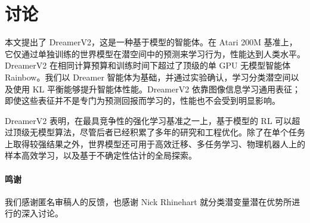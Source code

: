 \section{讨论}
\label{sec:discussion}

本文提出了 DreamerV2，这是一种基于模型的智能体。在 Atari 200M 基准上，它仅通过单独训练的世界模型在潜空间中的预测来学习行为，性能达到人类水平。DreamerV2 在相同计算预算和训练时间下超过了顶级的单 GPU 无模型智能体 Rainbow。我们以 Dreamer 智能体\citep{hafner2019dreamer}为基础，并通过实验确认，学习分类潜空间以及使用 KL 平衡能够提升智能体性能。DreamerV2 依靠图像信息学习通用表征；即使这些表征并不是专门为预测回报而学习的，性能也不会受到明显影响。

DreamerV2 表明，在最具竞争性的强化学习基准之一上，基于模型的 RL 可以超过顶级无模型算法，尽管后者已经积累了多年的研究和工程优化。除了在单个任务上取得较强结果之外，世界模型还可用于高效迁移、多任务学习、物理机器人上的样本高效学习，以及基于不确定性估计的全局探索。

\paragraph{鸣谢}
我们感谢匿名审稿人的反馈，也感谢 Nick Rhinehart 就分类潜变量潜在优势所进行的深入讨论。
